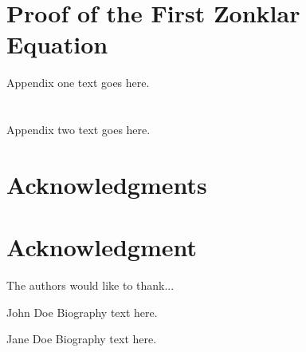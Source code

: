\documentclass[10pt,journal,compsoc]{IEEEtran}
\begin{document}
\appendices

\section{Proof of the First Zonklar Equation}
Appendix one text goes here.

\section{}
Appendix two text goes here.

\ifCLASSOPTIONcompsoc
  \section*{Acknowledgments}
\else
  \section*{Acknowledgment}
\fi

The authors would like to thank...





\ifCLASSOPTIONcaptionsoff
  \newpage
\fi

\begin{IEEEbiographynophoto}{John Doe}
Biography text here.
\end{IEEEbiographynophoto}

\begin{IEEEbiographynophoto}{Jane Doe}
Biography text here.
\end{IEEEbiographynophoto}
\end{document}
